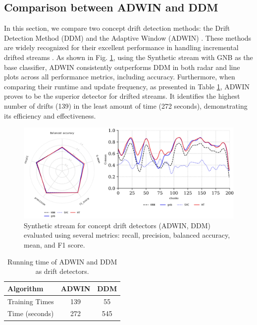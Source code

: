 \subsection{Comparison between ADWIN and DDM}
\label{sec:compared_drift_detector}
In this section, we compare two concept drift detection methods: the Drift Detection Method (DDM) \cite{gama2004learning} and the Adaptive Window (ADWIN) \cite{gama2004learning, adams2023explainable}. These methods are widely recognized for their excellent performance in handling incremental drifted streams \cite{gama2004learning, adams2023explainable, madkour2023historical, baena2006early}. As shown in Fig. \ref{fig:res5}, using the Synthetic stream with GNB as the base classifier, ADWIN consistently outperforms DDM in both radar and line plots across all performance metrics, including accuracy. Furthermore, when comparing their runtime and update frequency, as presented in Table \ref{table:table_4}, ADWIN proves to be the superior detector for drifted streams. It identifies the highest number of drifts (139) in the least amount of time (272 seconds), demonstrating its efficiency and effectiveness.
\begin{figure}[!ht]
	\centering
	\includegraphics[width=1\linewidth]{5_Emerging/images/res4.png}
	\caption{Synthetic stream for concept drift detectors (ADWIN, DDM) evaluated using several metrics: recall, precision, balanced accuracy, mean, and F1 score.}

	\label{fig:res5}
\end{figure}
	
\begin{table}[!ht]
	\centering
	\caption{Running time of ADWIN and DDM as drift detectors.}
	\begin{tabular}{|l|c|c|}
		\hline
	\textbf{Algorithm}     & \textbf{ADWIN} & \textbf{DDM}  \\ \hline
Training Times         & 139          & 55                   \\ \hline
Time (seconds)         & 272          & 545                   \\ \hline
	
	\end{tabular}
	\label{table:table_4}
	\end{table}